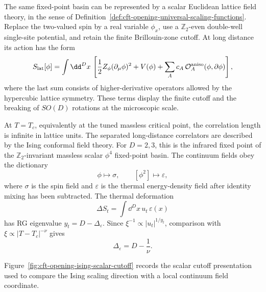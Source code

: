 The same fixed-point basin can be represented by a scalar Euclidean lattice
field theory, in the sense of
Definition~\ref{def:cft-opening-universal-scaling-functions}.  Replace the
two-valued spin by a real variable \(\phi_x\), use a \(\mathbb Z_2\)-even
double-well single-site potential, and retain the finite Brillouin-zone
cutoff.  At long distance its action has the form
\begin{equation}
  S_{\rm lat}[\phi]
  =
  \int\dd^Dx\,
  \left[
    \frac12 Z_\phi(\partial_\mu\phi)^2
    +
    V(\phi)
    +
    \sum_A c_A\,\mathcal O_A^{\rm aniso}(\phi,\partial\phi)
  \right],
  \label{eq:cft-opening-ising-scalar-cutoff}
\end{equation}
where the last sum consists of higher-derivative operators allowed by the
hypercubic lattice symmetry.  These terms display the finite cutoff and the
breaking of \(SO(D)\) rotations at the microscopic scale.

At \(T=T_c\), equivalently at the tuned massless critical point, the
correlation length is infinite in lattice units.  The separated long-distance
correlators are described by the Ising conformal field theory.  For
\(D=2,3\), this is the infrared fixed point of the \(\mathbb Z_2\)-invariant
massless scalar \(\phi^4\) fixed-point basin.  The continuum fields obey the
dictionary
\[
  \phi \longmapsto \sigma,
  \qquad
  [\phi^2]\longmapsto \varepsilon ,
\]
where \(\sigma\) is the spin field and \(\varepsilon\) is the thermal
energy-density field after identity mixing has been subtracted.  The thermal
deformation
\[
  \Delta S_t=\int\dd^Dx\,u_t\,\varepsilon(x)
\]
has RG eigenvalue \(y_t=D-\Delta_\varepsilon\).  Since
\(\xi^{-1}\propto |u_t|^{1/y_t}\), comparison with
\(\xi\propto |T-T_c|^{-\nu}\) gives
\begin{equation}
  \Delta_\varepsilon
  =
  D-\frac1{\nu}.
  \label{eq:cft-opening-ising-energy-dimension}
\end{equation}

Figure~\ref{fig:cft-opening-ising-scalar-cutoff} records the scalar cutoff
presentation used to compare the Ising scaling direction with a local
continuum field coordinate.

